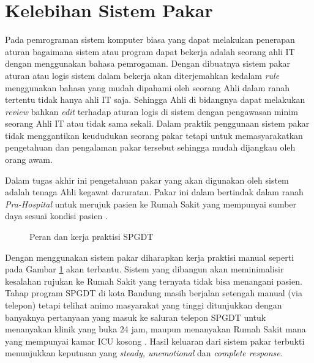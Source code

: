 \section{Kelebihan Sistem Pakar}
Pada pemrograman sistem komputer biasa yang dapat melakukan penerapan aturan bagaimana sistem atau program dapat bekerja adalah seorang ahli IT dengan menggunakan bahasa pemrogaman. Dengan dibuatnya sistem pakar aturan atau logis sistem dalam bekerja akan diterjemahkan kedalam \textit{rule} menggunakan bahasa yang mudah dipahami oleh seorang Ahli dalam ranah tertentu tidak hanya ahli IT saja. Sehingga Ahli di bidangnya dapat melakukan \textit{review} bahkan \textit{edit} terhadap aturan logis di sistem dengan pengawasan minim seorang Ahli IT atau tidak sama sekali. Dalam praktik penggunaan sistem pakar tidak menggantikan keududukan seorang pakar tetapi untuk memasyarakatkan pengetahuan dan pengalaman pakar tersebut sehingga mudah dijangkau oleh orang awam.\par
Dalam tugas akhir ini pengetahuan pakar yang akan digunakan oleh sistem adalah tenaga Ahli kegawat daruratan. Pakar ini dalam bertindak dalam ranah \textit{Pra-Hospital} untuk merujuk pasien ke Rumah Sakit yang mempunyai sumber daya sesuai kondisi pasien \cite{kemenkes}. 
\begin{figure}[h]	
	{\par}
	\caption{Peran dan kerja praktisi SPGDT}
	\label{fig:praktisi}
\end{figure}
Dengan menggunakan sistem pakar diharapkan kerja praktisi manual seperti pada Gambar \ref{fig:praktisi} akan terbantu. Sistem yang dibangun akan meminimalisir kesalahan rujukan ke Rumah Sakit yang ternyata tidak bisa menangani pasien. Tahap program SPGDT di kota Bandung masih berjalan setengah manual (via  telepon) tetapi telihat animo masyarakat yang tinggi ditunjukkan dengan banyaknya pertanyaan yang masuk ke saluran telepon SPGDT untuk menanyakan klinik yang buka 24 jam, maupun menanyakan Rumah Sakit mana yang mempunyai kamar ICU kosong \cite{tekno}. Hasil keluaran dari sistem pakar terbukti menunjukkan keputusan yang \textit{steady, unemotional} dan \textit{complete response.}

